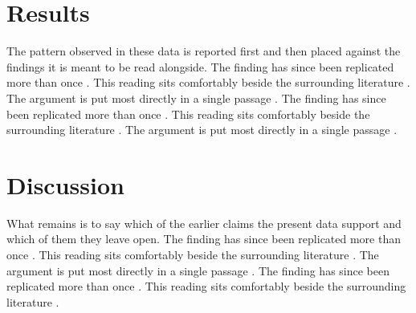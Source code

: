 \documentclass{article}
\begin{document}
\section{Results}
The pattern observed in these data is reported first and then placed against the findings it is meant to be read alongside. The finding has since been replicated more than once \parencite{blalocktaussig1945surgical,farber1948temporary}. This reading sits comfortably beside the surrounding literature \parencite{osler1892principles}. The argument is put most directly in a single passage \parencite[p.~14]{bantingbest1922internal}. The finding has since been replicated more than once \parencite{reed1900etiology,papanicolaoutraut1941diagnostic}. This reading sits comfortably beside the surrounding literature \parencite{barnard1967operation}. The argument is put most directly in a single passage \parencite[p.~14]{mullis1990unusual}.

\section{Discussion}
What remains is to say which of the earlier claims the present data support and which of them they leave open. The finding has since been replicated more than once \parencite{lister1867antiseptic,gregg1941congenital}. This reading sits comfortably beside the surrounding literature \parencite{cushing1932basophil}. The argument is put most directly in a single passage \parencite[p.~14]{salk1955studies}. The finding has since been replicated more than once \parencite{koch1882aetiologie,rontgen1895ueber}. This reading sits comfortably beside the surrounding literature \parencite{harvey1628exercitatio}.

\printbibliography
\end{document}
